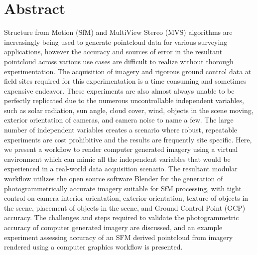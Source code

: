 \section*{Abstract}
Structure from Motion (SfM) and MultiView Stereo (MVS) algorithms are increasingly being used to generate pointcloud data for various surveying applications, however the accuracy and sources of error in the resultant pointcloud across various use cases are difficult to realize without thorough experimentation.  The acquisition of imagery and rigorous ground control data at field sites required for this experimentation is a time consuming and sometimes expensive endeavor.  These experiments are also almost always unable to be perfectly replicated due to the numerous uncontrollable independent variables, such as solar radiation, sun angle, cloud cover, wind, objects in the scene moving, exterior orientation of cameras, and camera noise to name a few.  The large number of independent variables creates a scenario where robust, repeatable experiments are cost prohibitive and the results are frequently site specific.  Here, we present a workflow to render computer generated imagery using a virtual environment which can mimic all the independent variables that would be experienced in a real-world data acquisition scenario.  The resultant modular workflow utilizes the open source software Blender for the generation of photogrammetrically accurate imagery suitable for SfM processing, with tight control on camera interior orientation, exterior orientation, texture of objects in the scene, placement of objects in the scene, and Ground Control Point (GCP) accuracy.  The challenges and steps required to validate the photogrammetric accuracy of computer generated imagery are discussed, and an example experiment assessing accuracy of an SFM derived pointcloud from imagery rendered using a computer graphics workflow is presented.
